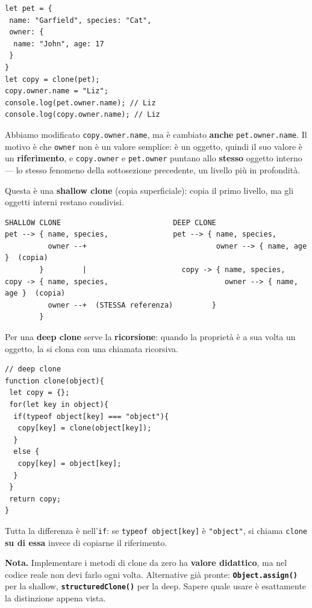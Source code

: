 \documentclass[10pt,a4paper]{article}
\newcommand{\nota}[1]{\textbf{\textcolor{ngreen}{Nota.}} #1}
\begin{document}
\begin{lstlisting}[style=js]
let pet = {
 name: "Garfield", species: "Cat",
 owner: {
  name: "John", age: 17
 }
}
let copy = clone(pet);
copy.owner.name = "Liz";
console.log(pet.owner.name); // Liz
console.log(copy.owner.name); // Liz
\end{lstlisting}

Abbiamo modificato \texttt{copy.owner.name}, ma è cambiato \textbf{anche} \texttt{pet.owner.name}. Il motivo è che \texttt{owner} non è un valore semplice: è un oggetto, quindi il suo valore è un \textbf{riferimento}, e \texttt{copy.owner} e \texttt{pet.owner} puntano allo \textbf{stesso} oggetto interno --- lo stesso fenomeno della sottosezione precedente, un livello più in profondità.

Questa è una \textbf{shallow clone} (copia superficiale): copia il primo livello, ma gli oggetti interni restano condivisi.

\begin{lstlisting}[style=plain]
SHALLOW CLONE                          DEEP CLONE
pet --> { name, species,               pet --> { name, species,
          owner --+                              owner --> { name, age }  (copia)
        }         |                      copy -> { name, species,
copy -> { name, species,                           owner --> { name, age }  (copia)
          owner --+  (STESSA referenza)         }
        }
\end{lstlisting}

Per una \textbf{deep clone} serve la \textbf{ricorsione}: quando la proprietà è a sua volta un oggetto, la si clona con una chiamata ricorsiva.

\begin{lstlisting}[style=js]
// deep clone
function clone(object){
 let copy = {};
 for(let key in object){
  if(typeof object[key] === "object"){
   copy[key] = clone(object[key]);
  }
  else {
   copy[key] = object[key];
  }
 }
 return copy;
}
\end{lstlisting}

Tutta la differenza è nell'\texttt{if}: se \texttt{typeof object[key]} è \texttt{"object"}, si chiama \texttt{clone} \textbf{su di essa} invece di copiarne il riferimento.

\begin{notebox}
\nota{Implementare i metodi di clone da zero ha \textbf{valore didattico}, ma nel codice reale non devi farlo ogni volta. Alternative già pronte: \textbf{\texttt{Object.assign()}} per la shallow, \textbf{\texttt{structuredClone()}} per la deep. Sapere quale usare è esattamente la distinzione appena vista.}
\end{notebox}
\end{document}
